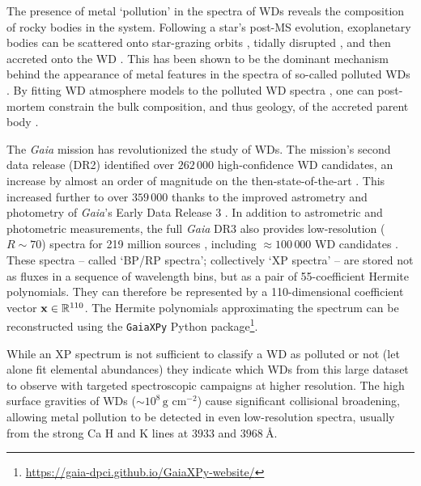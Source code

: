 \documentclass[fleqn,usenatbib]{rasti}
\newcommand\xb{\vb{x}}
\begin{document}
The presence of metal `pollution' in the spectra of WDs reveals the composition of rocky bodies in the system.
Following a star's post-MS evolution, exoplanetary bodies can be scattered onto star-grazing orbits \citep{debes02, bonsor11, frewen14, mustill18, maldonado20dyn, maldonado20und}, tidally disrupted \citep{jura03, veras14}, and then accreted onto the WD \citep{brouwers22}.
This has been shown to be the dominant mechanism behind the appearance of metal features in the spectra of so-called polluted WDs \citep[e.g.,][]{farihi10, veras16}.
By fitting WD atmosphere models to the polluted WD spectra \citep[e.g.][]{koester05, koester11, dufour07, hollands17, hollands18, blouin18, badenasagusti24}, one can post-mortem constrain the bulk composition, and thus geology, of the accreted parent body \citep[e.g.][]{xu21}.

The \textit{Gaia} mission \citep{gaia} has revolutionized the study of WDs.
The mission's second data release (DR2) identified over $262\,000$ high-confidence WD candidates, an increase by almost an order of magnitude on the then-state-of-the-art \citep{gentilefusillo19, gaiadr2}.
This increased further to over $359\,000$ thanks to the improved astrometry and photometry of \textit{Gaia}'s Early Data Release 3 \citep[EDR3;][]{gentilefusillo21, gaiadr3}.
In addition to astrometric and photometric measurements, the full \textit{Gaia} DR3 also provides low-resolution ($R\sim70$) spectra for 219 million sources
\citep{carrasco21, gaiadr3}, including $\approx100\,000$ WD candidates \citep{gentilefusillo21}.
These spectra -- called `BP/RP spectra'; collectively `XP spectra' -- are stored not as fluxes in a sequence of wavelength bins, but as a pair of 55-coefficient Hermite polynomials.
They can therefore be represented by a 110-dimensional coefficient vector $\xb\in\mathbb{R}^{110}$.
The Hermite polynomials approximating the spectrum can be reconstructed using the \texttt{GaiaXPy} Python package\footnote{
    \url{https://gaia-dpci.github.io/GaiaXPy-website/}
}.

While an XP spectrum is not sufficient to classify a WD as polluted or not (let alone fit elemental abundances) they indicate which WDs from this large dataset to observe with targeted spectroscopic campaigns at higher resolution.
The high surface gravities of WDs ($\sim 10^8\,\text{g cm}^{-2}$) cause significant collisional broadening, allowing metal pollution to be detected in even low-resolution spectra, usually from the strong Ca H and K lines at $3933$ and $3968~\text{\AA}$.
\end{document}
